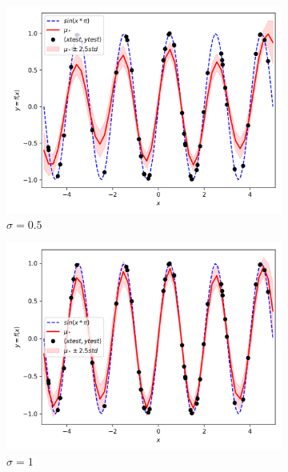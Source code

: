 \documentclass{article}
\begin{document}
\begin{figure}[ht]
\begin{subfigure}{.33\textwidth}
    \includegraphics[width=\linewidth]{kernelSE/s/0_5.png}
    \caption{$\sigma = 0.5$}
    \label{fig:s025}
  \end{subfigure}
  \begin{subfigure}{.33\textwidth}
    \centering
    \includegraphics[width=\linewidth]{kernelSE/s/1.png}
    \caption{$\sigma = 1$}
    \label{fig:s05}
  \end{subfigure}
  \begin{subfigure}{.33\textwidth}
    \centering

\end{subfigure}
\end{figure}
\end{document}
